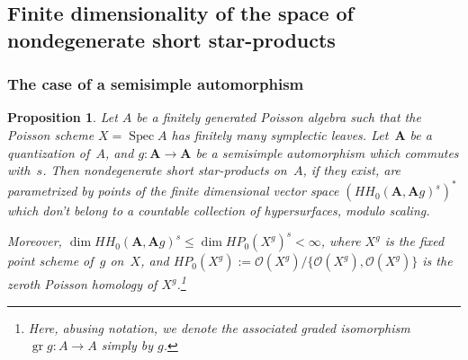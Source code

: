 \documentclass[11pt]{article}
\numberwithin{equation}{section}
\numberwithin{equation}{section}
\newtheorem{Proposition}[Theorem]{Proposition}
\begin{document}
\setcounter{subsection}{4}\setcounter{Theorem}{10}\setcounter{footnote}{8}
\subsection{Finite dimensionality of the space of nondegenerate short star-products}

\subsubsection{The case of a semisimple automorphism}

\begin{Proposition}\label{finde1} Let $A$ be a finitely generated Poisson algebra such that the Poisson scheme $X=\operatorname{Spec}A$ has finitely many symplectic leaves. Let~${\mathbf A}$ be a quantization of~$A$, and \mbox{$g\colon {{\mathbf A}}\to {{\mathbf A}}$} be a semisimple automorphism which commutes with~$s$. Then nondegenerate short star-products on~$A$, if they exist, are parametrized by points of the finite dimensional vector space \linebreak $(HH_0({{\mathbf A}},{{\mathbf A}}g)^s)^*$ which don't belong to a countable collection of hypersurfaces, modulo scaling.

Moreover, $\dim HH_0({{\mathbf A}},{{\mathbf A}}g)^s\le \dim HP_0(X^g)^s<\infty$, where $X^g$ is the fixed point scheme of~$g$ on~$X$, and $HP_0(X^g):= \mathcal{O}(X^g)/\lbrace{\mathcal{O}(X^g), \mathcal{O}(X^g)\rbrace}$ is the zeroth Poisson homology of $X^g$.\footnote{Here, abusing notation, we denote the associated graded isomorphism $\operatorname{gr}g\colon A\to A$ simply by $g$.}
\end{Proposition}
\end{document}
